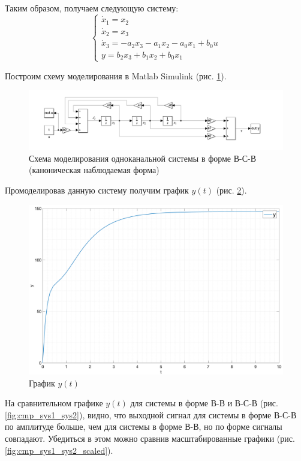 Таким образом, получаем следующую систему:
\begin{equation}
    \begin{cases}
        \dot{x}_1 = x_2 \\
        \dot{x}_2 = x_3 \\
        \dot{x}_3 = -a_2 x_3 - a_1 x_2 - a_0 x_1 + b_0 u \\
        y = b_2 x_3 + b_1 x_2 + b_0 x_1
    \end{cases}
\end{equation}

Построим схему моделирования в Matlab Simulink (рис. \ref{fig:model2}).
\begin{figure}[ht!]
    \centering
    \includegraphics[width=\textwidth]{media/system2.png}
    \caption{Схема моделирования одноканальной системы в форме В-С-В (каноническая наблюдаемая форма)}
    \label{fig:model2}
\end{figure}

Промоделировав данную систему получим график $y(t)$ (рис. \ref{fig:yt2}).
\begin{figure}[ht!]
    \centering
    \includegraphics[width=\textwidth]{media/sys2_y(t).png}
    \caption{График $y(t)$}
    \label{fig:yt2}
\end{figure}

На сравнительном графике $y(t)$ для системы в форме В-В и В-С-В (рис. \ref{fig:cmp_sys1_sys2}), видно, что выходной сигнал 
для системы в форме В-С-В по амплитуде больше, чем для системы в форме В-В, но по форме сигналы совпадают. Убедиться в этом 
можно сравнив масштабированные графики (рис. \ref{fig:cmp_sys1_sys2_scaled}).

